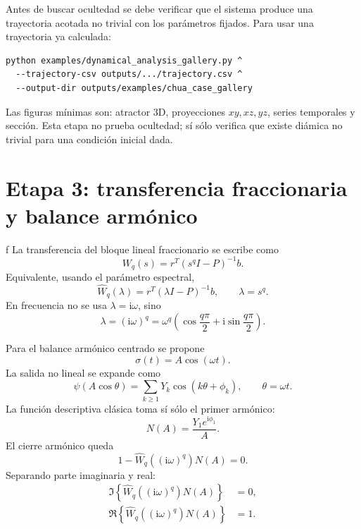 \documentclass[11pt]{article}
\newcommand{\ii}{\mathrm{i}}
\begin{document}
Antes de buscar ocultedad se debe verificar que el sistema produce una trayectoria acotada no trivial con los parámetros fijados. Para usar una trayectoria ya calculada:
\begin{lstlisting}
python examples/dynamical_analysis_gallery.py ^
  --trajectory-csv outputs/.../trajectory.csv ^
  --output-dir outputs/examples/chua_case_gallery
\end{lstlisting}

Las figuras mínimas son: atractor 3D, proyecciones \(xy,xz,yz\), series temporales y sección. Esta etapa no prueba ocultedad; sí sólo verifica que existe diámica no trivial para una condición inicial dada.

\section{Etapa 3: transferencia fraccionaria y balance armónico}
f
La transferencia del bloque lineal fraccionario se escribe como
\begin{equation}
W_q(s)=r^T(s^qI-P)^{-1}b.
\end{equation}
Equivalente, usando el parámetro espectral,
\begin{equation}
\widehat W_q(\lambda)=r^T(\lambda I-P)^{-1}b,
\qquad
\lambda=s^q.
\end{equation}
En frecuencia no se usa \(\lambda=\ii\omega\), sino
\begin{equation}
\lambda=(\ii\omega)^q
=\omega^q\left(\cos\frac{q\pi}{2}+\ii\sin\frac{q\pi}{2}\right).
\end{equation}

Para el balance armónico centrado se propone
\begin{equation}
\sigma(t)=A\cos(\omega t).
\end{equation}
La salida no lineal se expande como
\begin{equation}
\psi(A\cos\theta)
=\sum_{k\ge 1}Y_k\cos(k\theta+\phi_k),
\qquad \theta=\omega t.
\end{equation}
La función descriptiva clásica toma sí sólo el primer armónico:
\begin{equation}
N(A)=\frac{Y_1e^{\ii\phi_1}}{A}.
\end{equation}
El cierre armónico queda
\begin{equation}
1-\widehat W_q((\ii\omega)^q)N(A)=0.
\end{equation}
Separando parte imaginaria y real:
\begin{align}
\Im\left\{\widehat W_q((\ii\omega)^q)N(A)\right\}&=0,\\
\Re\left\{\widehat W_q((\ii\omega)^q)N(A)\right\}&=1.
\end{align}
\end{document}
